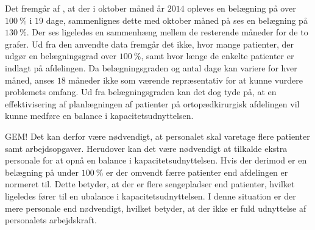 \noindent
Det fremgår af , at der i oktober måned år $2014$ opleves en belægning på over $100~\%$ i $19$ dage, sammenlignes dette med oktober måned på  ses en belægning på $130~\%$. Der ses ligeledes en sammenhæng mellem de resterende måneder for de to grafer. 
Ud fra den anvendte data fremgår det ikke, hvor mange patienter, der udgør en belægningsgrad over $100~\%$, samt hvor længe de enkelte patienter er indlagt på afdelingen. Da belægningsgraden og antal dage kan variere for hver måned, anses $18$ måneder ikke som værende repræsentativ for at kunne vurdere problemets omfang. Ud fra belægningsgraden kan det dog tyde på, at en effektivisering af planlægningen af patienter på ortopædkirurgisk afdelingen vil kunne medføre en balance i kapacitetsudnyttelsen.












GEM!
Det kan derfor være nødvendigt, at personalet skal varetage flere patienter samt arbejdsopgaver. Herudover kan det være nødvendigt at tilkalde ekstra personale for at opnå en balance i kapacitetsudnyttelsen.
Hvis der derimod er en belægning på under $100~\%$ er der omvendt færre patienter end afdelingen er normeret til. Dette betyder, at der er flere sengepladser end patienter, hvilket ligeledes fører til en ubalance i kapacitetsudnyttelsen. I denne situation er der mere personale end nødvendigt, hvilket betyder, at der ikke er fuld udnyttelse af personalets arbejdskraft.\cite{Pauly1986} 
